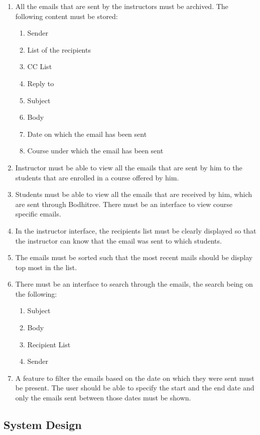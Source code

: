 \begin{enumerate}
	\item All the emails that are sent by the instructors must be archived. The following content must be stored:
	\begin{enumerate}
		\item Sender
		\item List of the recipients
		\item CC List
		\item Reply to
		\item Subject
		\item Body
		\item Date on which the email has been sent
		\item Course under which the email has been sent
	\end{enumerate}
	\item Instructor must be able to view all the emails that are sent by him to the students that are enrolled in a course offered by him.
	\item Students must be able to view all the emails that are received by him, which are sent through Bodhitree. There must be an interface to view course specific emails.
	\item In the instructor interface, the recipients list must be clearly displayed so that the instructor can know that the email was sent to which students.
	\item The emails must be sorted such that the most recent mails should be display top most in the list.
	\item There must be an interface to search through the emails, the search being on the following:
	\begin{enumerate}
		\item Subject
		\item Body
		\item Recipient List
		\item Sender
	\end{enumerate}
	\item A feature to filter the emails based on the date on which they were sent must be present. The user should be able to specify the start and the end date and only the emails sent between those dates must be shown.
\end{enumerate}

\subsection{System Design}

